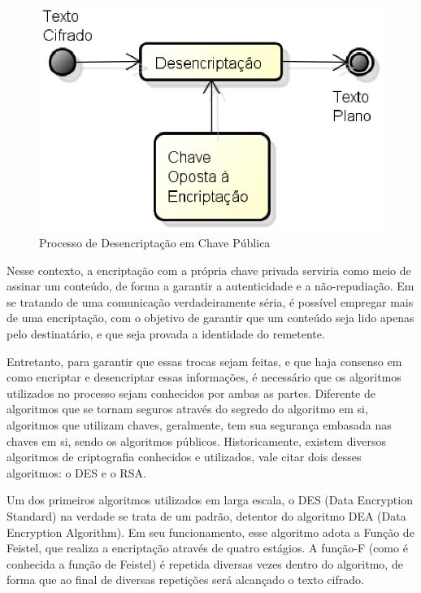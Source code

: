 	\begin{figure}[h]
		\centering
		\label{img04}
		\caption{Processo de Desencriptação em Chave Pública}
		\includegraphics[keepaspectratio=true,scale=0.5]{figuras/desencript.eps}
	\end{figure}

	Nesse contexto, a encriptação com a própria chave privada serviria como meio de assinar um conteúdo, de forma a garantir a autenticidade e a não-repudiação. Em se tratando de uma comunicação verdadeiramente séria, é possível empregar mais de uma encriptação, com o objetivo de garantir que um conteúdo seja lido apenas pelo destinatário, e que seja provada a identidade do remetente.
	
	Entretanto, para garantir  que essas trocas sejam feitas, e que haja consenso em como encriptar e desencriptar essas informações, é necessário que os algoritmos utilizados no processo sejam conhecidos por ambas as partes. Diferente de algoritmos que se tornam seguros através do segredo do algoritmo em si, algoritmos que utilizam chaves, geralmente, tem sua segurança embasada nas chaves em si, sendo os algoritmos públicos. Historicamente, existem diversos algoritmos de criptografia conhecidos e utilizados, vale citar dois desses algoritmos: o DES e o RSA.
	
	Um dos primeiros algoritmos utilizados em larga escala, o DES (Data Encryption Standard) na verdade se trata de um padrão, detentor do algoritmo DEA (Data Encryption Algorithm). Em seu funcionamento, esse algoritmo adota a Função de Feistel, que realiza a encriptação através de quatro estágios. A função-F (como é conhecida a função de Feistel) é repetida diversas vezes dentro do algoritmo, de forma que ao final de diversas repetições será alcançado o texto cifrado.
	
